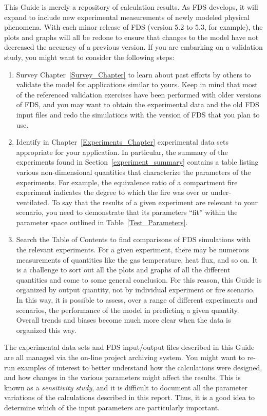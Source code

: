 This Guide is merely a repository of calculation results. As FDS develops, it will expand to include new experimental
measurements of newly modeled physical phenomena. With each minor release of FDS (version 5.2 to 5.3, for example),
the plots and graphs will all be redone to ensure that changes to the model have not decreased the accuracy of a
previous version. If you are embarking on a validation study, you might want to consider the following steps:
\begin{enumerate}
\item Survey Chapter~\ref{Survey_Chapter} to learn about past efforts by others to validate the model for
applications similar to yours. Keep in mind that most of the referenced validation exercises have been performed with
older versions of FDS, and you may want to obtain the experimental data and the old FDS input files and redo the
simulations with the version of FDS that you plan to use.
\item Identify in Chapter~\ref{Experiments_Chapter} experimental data sets appropriate for your application. In particular,
the summary of the experiments found in Section~\ref{experiment_summary} contains a table listing various non-dimensional
quantities that characterize the parameters of the experiments. For example, the equivalence ratio of a compartment fire
experiment indicates the degree to which the fire was over or under-ventilated.
To say that the results of a given experiment are relevant to
your scenario, you need to demonstrate that its parameters ``fit'' within the parameter space outlined in
Table~\ref{Test_Parameters}.
\item Search the Table of Contents to find comparisons of FDS simulations with the relevant experiments.
For a given experiment, there may be numerous measurements of quantities like the gas temperature,
heat flux, and so on.
It is a challenge to sort out all the plots and graphs of all the different quantities and come to some general conclusion.
For this reason, this Guide is organized by output quantity, not by individual experiment or fire scenario.
In this way, it is possible to assess, over a range of
different experiments and scenarios, the performance of the model in predicting a given quantity.
Overall trends and biases become much more clear when the data is organized this way.
\end{enumerate}

The experimental data sets and FDS input/output files described in this Guide are all managed via the on-line project archiving system.
You might want to re-run examples of interest
to better understand how the calculations were designed, and how changes in the various parameters might affect the results.
This is known as a {\em sensitivity study},
and it is difficult to document all the parameter variations of the calculations described in this report.
Thus, it is a good idea to determine which of the input parameters are particularly important.



